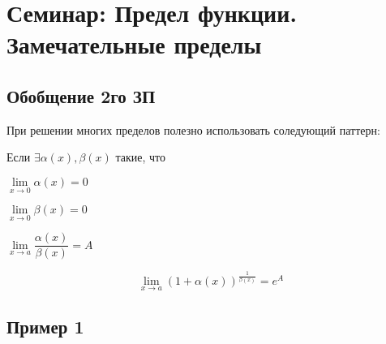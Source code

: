 \section{Семинар: Предел функции. Замечательные пределы}

\subsection{Обобщение 2го ЗП}

При решении многих пределов полезно использовать соледующий паттерн:

Если $ \exists  \alpha(x), \beta(x) $ такие, что 

$ \lim\limits_{x \to 0 } \alpha(x) = 0 $

$ \lim\limits_{x \to 0 } \beta(x) = 0 $

$ \lim\limits_{x \to a } \dfrac{\alpha(x)}{\beta(x)} = A $

$$
\lim\limits_{x \to a } \left( 1 + \alpha(x)  \right )^{\frac{1}{\beta(x)}} = e^{A}
$$

\subsection{Пример 1}


